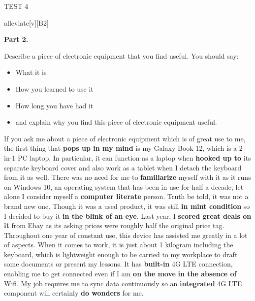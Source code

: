 \begin{glossarymc}[Cambridge 7]
\begin{test}{TEST 4}
\begin{VocabExplain}[Part 1]
        \begin{ExplainCard}{alleviate}[v][B2]
        \end{ExplainCard}
    \end{VocabExplain}

    \noindent
    \textbf{Part 2.}
    \begin{qa}{Describe a piece of electronic equipment that you find useful. You should say:}
    \begin{itemize}
    \item What it is
    \item How you learned to use it
    \item How long you have had it
    \item and explain why you find this piece of electronic equipment useful.
    \end{itemize}
 
    If you ask me about a piece of electronic equipment which is of great use to me, the first thing that \textbf{pops up in my mind} is my Galaxy Book 12, which is a 2-in-1 PC laptop. In particular, it can function as a laptop when \textbf{hooked up to} its separate keyboard cover and also work as a tablet when I detach the keyboard from it as well. There was no need for me to \textbf{familiarize} myself with it as it runs on Windows 10, an operating system that has been in use for half a decade, let alone I consider myself a \textbf{computer literate} person. Truth be told, it was not a brand new one. Though it was a used product, it was still \textbf{in mint condition} so I decided to buy it \textbf{in the blink of an eye}. Last year, I \textbf{scored great deals on it} from Ebay as its asking prices were roughly half the original price tag. Throughout one year of constant use, this device has assisted me greatly in a lot of aspects. When it comes to work, it is just about 1 kilogram including the keyboard, which is lightweight enough to be carried to my workplace to draft some documents or present my lessons. It has \textbf{built-in} 4G LTE connection, enabling me to get connected even if I am \textbf{on the move} \textbf{in the absence of} Wifi. My job requires me to sync data continuously so an \textbf{integrated} 4G LTE component will certainly \textbf{do wonders} for me.
    \end{qa}


\end{test}
\end{glossarymc}
